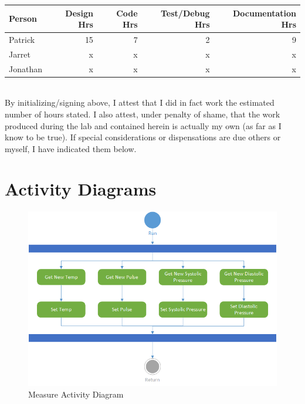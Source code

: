 \documentclass[12pt]{article} %
\begin{document}
\begin{tabular}{|l|*{4}{r|}}
	\hline
	Person & Design Hrs & Code Hrs & Test/Debug Hrs & Documentation Hrs \\ \hline
	Patrick & 15 & 7 & 2 & 9  \\ \hline
	Jarret & x & x & x & x  \\ \hline
	Jonathan & x & x & x & x  \\ \hline
\end{tabular}

~\\

By initializing/signing above, I attest that I did in fact work the estimated number of hours stated. I also attest, under penalty of shame, that the work produced during the lab and contained herein is actually my own (as far as I know to be true). If special considerations or dispensations are due others or myself, I have indicated them below.

\section{Activity Diagrams}

\begin{figure}
  \centering
  \includegraphics[width=\textwidth]{../design/measure_activity.png}
  \caption{Measure Activity Diagram}
  \label{fig:measure}
\end{figure}
\end{document}
